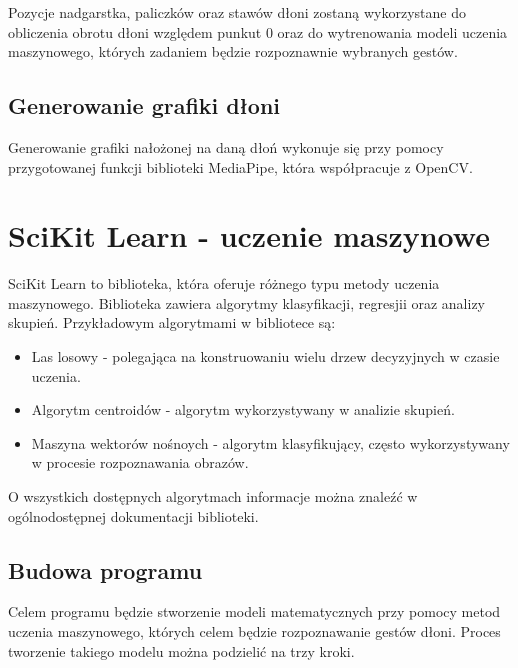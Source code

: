 \quad Pozycje nadgarstka, paliczków oraz stawów dłoni zostaną wykorzystane do obliczenia obrotu dłoni względem punkut 0 oraz do wytrenowania modeli uczenia maszynowego, których zadaniem będzie rozpoznawnie wybranych gestów. 

\subsection{Generowanie grafiki dłoni}

\quad Generowanie grafiki nałożonej na daną dłoń wykonuje się przy pomocy przygotowanej funkcji biblioteki MediaPipe, która współpracuje z OpenCV. 



\section{SciKit Learn - uczenie maszynowe}

\quad SciKit Learn to biblioteka, która oferuje różnego typu metody uczenia maszynowego. Biblioteka zawiera algorytmy klasyfikacji, regresjii oraz analizy skupień. Przykładowym algorytmami w bibliotece są:

\begin{itemize}
    \item Las losowy - polegająca na konstruowaniu wielu drzew decyzyjnych w czasie uczenia. 
    \item Algorytm centroidów - algorytm wykorzystywany w analizie skupień.
    \item Maszyna wektorów nośnoych - algorytm klasyfikujący, często wykorzystywany w procesie rozpoznawania obrazów. 
\end{itemize}

O wszystkich dostępnych algorytmach informacje można znaleźć w ogólnodostępnej dokumentacji biblioteki. 



\subsection{Budowa programu}
Celem programu będzie stworzenie modeli matematycznych przy pomocy metod uczenia maszynowego, których celem będzie rozpoznawanie gestów dłoni. Proces tworzenie takiego modelu można podzielić na trzy kroki.

